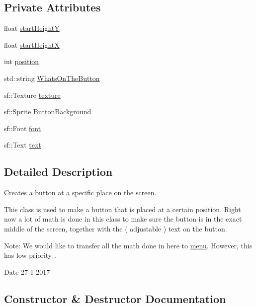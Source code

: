 \subsection*{Private Attributes}
\begin{DoxyCompactItemize}
\item 
float \hyperlink{class_button_afe532ea0d5dd3fea5341ba1cb3e64e0b}{start\+HeightY}
\item 
float \hyperlink{class_button_a954fb7025b688b7b2a4d8d16adca74eb}{start\+HeightX}
\item 
int \hyperlink{class_button_a6853c434f05010c4b2582fb757f96bef}{position}
\item 
std\+::string \hyperlink{class_button_a960b5ee6c11f9385763838b1d788f010}{Whats\+On\+The\+Button}
\item 
sf\+::\+Texture \hyperlink{class_button_aa0cf48f8db00201090fbbd702ee81fb9}{texture}
\item 
sf\+::\+Sprite \hyperlink{class_button_ab1ca1099a4726cdb09a7abd641685a6a}{Button\+Background}
\item 
sf\+::\+Font \hyperlink{class_button_ab6290d275363f4b0e133eec450845ca1}{font}
\item 
sf\+::\+Text \hyperlink{class_button_aadf908b0777f2ae5c28d949fda3384c1}{text}
\end{DoxyCompactItemize}


\subsection{Detailed Description}
Creates a button at a specific place on the screen. 

This class is used to make a button that is placed at a certain position. Right now a lot of math is done in this class to make sure the button is in the exact middle of the screen, together with the ( adjustable ) text on the button.

Note\+: We would like to transfer all the math done in here to \hyperlink{classmenu}{menu}. However, this has low priority .

\begin{DoxyDate}{Date}
27-\/1-\/2017 
\end{DoxyDate}


\subsection{Constructor \& Destructor Documentation}
\mbox{\label{class_button_a1085aea4e01df12c1400d2f2f666dda2}} 
